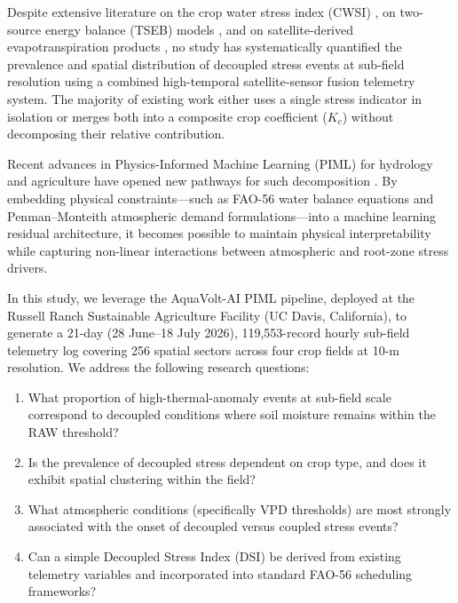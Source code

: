 \documentclass[review,12pt]{elsarticle}
\begin{document}
Despite extensive literature on the crop water stress index (CWSI) \citep{idso1981normalizing, moran1994combining}, on two-source energy balance (TSEB) models \citep{norman1995source, timmermans2007relationship}, and on satellite-derived evapotranspiration products \citep{bastiaanssen1998remote, anderson2011usability}, no study has systematically quantified the prevalence and spatial distribution of decoupled stress events at sub-field resolution using a combined high-temporal satellite-sensor fusion telemetry system. The majority of existing work either uses a single stress indicator in isolation or merges both into a composite crop coefficient ($K_c$) without decomposing their relative contribution.

Recent advances in Physics-Informed Machine Learning (PIML) for hydrology and agriculture have opened new pathways for such decomposition \citep{shen2023deephydrology, zhu2024piml}. By embedding physical constraints---such as FAO-56 water balance equations and Penman--Monteith atmospheric demand formulations---into a machine learning residual architecture, it becomes possible to maintain physical interpretability while capturing non-linear interactions between atmospheric and root-zone stress drivers.

In this study, we leverage the AquaVolt-AI PIML pipeline, deployed at the Russell Ranch Sustainable Agriculture Facility (UC Davis, California), to generate a 21-day (28 June–18 July 2026), 119,553-record hourly sub-field telemetry log covering 256 spatial sectors across four crop fields at 10-m resolution. We address the following research questions:

\begin{enumerate}
  \item What proportion of high-thermal-anomaly events at sub-field scale correspond to decoupled conditions where soil moisture remains within the RAW threshold?
  \item Is the prevalence of decoupled stress dependent on crop type, and does it exhibit spatial clustering within the field?
  \item What atmospheric conditions (specifically VPD thresholds) are most strongly associated with the onset of decoupled versus coupled stress events?
  \item Can a simple Decoupled Stress Index (DSI) be derived from existing telemetry variables and incorporated into standard FAO-56 scheduling frameworks?
\end{enumerate}
\end{document}
